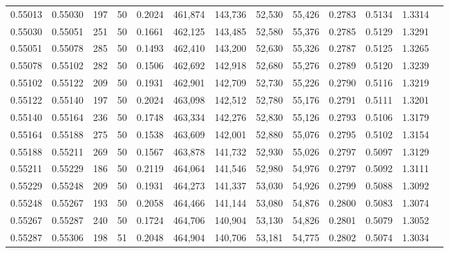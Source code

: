 \begin{tabular}{rrrrrrrrrrrrr}
0.55013 & 0.55030 &   197 &  50 &                                     0.2024 & 461,874 & 143,736 &  52,530 &  55,426 & 0.2783 & 0.5134 & 1.3314 \\
0.55030 & 0.55051 &   251 &  50 &                                     0.1661 & 462,125 & 143,485 &  52,580 &  55,376 & 0.2785 & 0.5129 & 1.3291 \\
0.55051 & 0.55078 &   285 &  50 &                                     0.1493 & 462,410 & 143,200 &  52,630 &  55,326 & 0.2787 & 0.5125 & 1.3265 \\
0.55078 & 0.55102 &   282 &  50 &                                     0.1506 & 462,692 & 142,918 &  52,680 &  55,276 & 0.2789 & 0.5120 & 1.3239 \\
0.55102 & 0.55122 &   209 &  50 &                                     0.1931 & 462,901 & 142,709 &  52,730 &  55,226 & 0.2790 & 0.5116 & 1.3219 \\
0.55122 & 0.55140 &   197 &  50 &                                     0.2024 & 463,098 & 142,512 &  52,780 &  55,176 & 0.2791 & 0.5111 & 1.3201 \\
0.55140 & 0.55164 &   236 &  50 &                                     0.1748 & 463,334 & 142,276 &  52,830 &  55,126 & 0.2793 & 0.5106 & 1.3179 \\
0.55164 & 0.55188 &   275 &  50 &                                     0.1538 & 463,609 & 142,001 &  52,880 &  55,076 & 0.2795 & 0.5102 & 1.3154 \\
0.55188 & 0.55211 &   269 &  50 &                                     0.1567 & 463,878 & 141,732 &  52,930 &  55,026 & 0.2797 & 0.5097 & 1.3129 \\
0.55211 & 0.55229 &   186 &  50 &                                     0.2119 & 464,064 & 141,546 &  52,980 &  54,976 & 0.2797 & 0.5092 & 1.3111 \\
0.55229 & 0.55248 &   209 &  50 &                                     0.1931 & 464,273 & 141,337 &  53,030 &  54,926 & 0.2799 & 0.5088 & 1.3092 \\
0.55248 & 0.55267 &   193 &  50 &                                     0.2058 & 464,466 & 141,144 &  53,080 &  54,876 & 0.2800 & 0.5083 & 1.3074 \\
0.55267 & 0.55287 &   240 &  50 &                                     0.1724 & 464,706 & 140,904 &  53,130 &  54,826 & 0.2801 & 0.5079 & 1.3052 \\
0.55287 & 0.55306 &   198 &  51 &                                     0.2048 & 464,904 & 140,706 &  53,181 &  54,775 & 0.2802 & 0.5074 & 1.3034 \\

\end{tabular}
